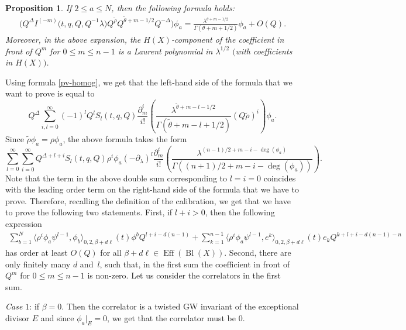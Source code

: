 \documentclass[10pt,a4paper]{article}
\numberwithin{equation}{section}
\newtheorem{Proposition}[Theorem]{Proposition}
\begin{document}
\begin{Proposition}\label{prop:Q-exp_phia}
If $2\leq a\leq N$, then the following formula holds:
\begin{align*}
\big(
Q^\Delta
I^{(-m)}\big(t,q,Q, Q^{-1}\lambda\big)
Q^{\widetilde{\rho}} Q^{\widetilde{\theta}+m-1/2}
Q^{-\Delta} \big) \phi_a =
\frac{
\lambda^{\theta+m-1/2}
}{
\Gamma(\theta+m+1/2)} \phi_a + O(Q).
\end{align*}
Moreover, in the above expansion, the $H(X)$-component of the coefficient in front of $Q^m$ for $0\leq m\leq n-1$ is a Laurent polynomial in $\lambda^{1/2}$
$($with coefficients in $H(X))$.
\end{Proposition}
\proof
Using formula \eqref{pv-homog}, we get that the left-hand side of the formula that we want to prove is equal to
\[
Q^\Delta
\sum_{i,l=0}^\infty
(-1)^l Q^l S_l(t,q,Q)
\frac{\partial_m^i}{i!}\left(
\frac{\lambda^{\widetilde{\theta}+m-l-1/2}}{
\Gamma(\widetilde{\theta}+m-l+1/2)}
(Q\widetilde{\rho})^i \right)
\phi_a.
\]
Since $\widetilde{\rho} \phi_a = \rho \phi_a$, the above formula takes the form
\begin{equation}\label{rho-component}
\sum_{l=0}^\infty
\sum_{i=0}^\infty
Q^{\Delta+l+i} S_l(t,q,Q) \rho^i\phi_a
(-\partial_\lambda)^l
\frac{\partial_m^i}{i!}\left(
\frac{\lambda^{(n-1)/2+m-i-\operatorname{deg}(\phi_a)}}{
\Gamma((n+1)/2+m-i-\operatorname{deg}(\phi_a))}
\right).
\end{equation}
Note that the term in the above double sum corresponding to $l=i=0$ coincides with the leading order term on the right-hand side of the formula that we have to prove. Therefore, recalling the definition of the calibration, we get that we have to prove the following two statements. First, if $l+i>0$, then the following expression
\begin{align*}%
\sum_{b=1}^N\!
\big\langle \rho^i\phi_a \psi^{l-1},\phi_b\big\rangle_{0,2,\beta+d\ell} (t) \phi^b Q^{l+i-d(n-1)} +
\sum_{k=1}^{n-1}\!
\big\langle \rho^i\phi_a \psi^{l-1}, e^k\big\rangle_{0,2,\beta+d\ell} (t) e_k Q^{k+l+i-d(n-1)-n}
\end{align*}
has order at least $O(Q)$ for all $\beta+d\ell\in \operatorname{Eff}(\operatorname{Bl}(X))$. Second, there are only finitely many $d$ and~$l$, such that, in the first sum the coefficient in front of $Q^m$ for $0\leq m\leq n-1$ is non-zero. Let us consider the correlators in the first sum.

{\em Case $1$}: if $\beta=0$. Then the correlator is a twisted GW invariant of the exceptional divisor $E$ and since $\phi_a|_E=0$, we get that the correlator must be $0$.
\end{document}
